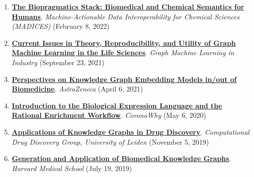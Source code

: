 \documentclass[10pt,a4paper,sans]{moderncv} %
\begin{document}
\begin{enumerate}
    \item \textbf{\href{https://docs.google.com/presentation/d/1D0HIX41IgVdTQYKlakWcvlZvOktX23EqbLcs3LmI7mg/edit?usp=sharing}{The Biopragmatics Stack: Biomedical and Chemical Semantics for Humans}}. \textit{Machine-Actionable Data Interoperability for Chemical Sciences (MADICES)} (February 8, 2022)

    \item \textbf{\href{https://www.youtube.com/watch?v=bLN1V5fZD2g&t=3665s}{Current Issues in Theory, Reproducibility, and Utility of Graph Machine Learning in the Life Sciences}}. \textit{Graph Machine Learning in Industry} (September 23, 2021)

    \item \textbf{\href{https://bit.ly/3wvP8yq}{Perspectives on Knowledge Graph Embedding Models in/out of Biomedicine}}. \textit{AstraZeneca} (April 6, 2021)

    \item \textbf{\href{https://youtu.be/rHhuVBpoKdI}{Introduction to the Biological Expression Language and the Rational Enrichment Workflow}}. \textit{CoronaWhy} (May 6, 2020)

    \item \textbf{\href{https://docs.google.com/presentation/d/1NQHQSD2EjOh-9XD6ffr2rDqs8AwOQ3wSBoie-e7-OXU/edit?usp=sharing}{Applications of Knowledge Graphs in Drug Discovery}}. \textit{Computational Drug Discovery Group, University of Leiden} (November 5, 2019)

    \item \textbf{\href{https://docs.google.com/presentation/d/11CG_Q3JrsqqKsDhl8uXP_TZzcyALhcVLvoP_pDmQ5JA/edit?usp=sharing}{Generation and Application of Biomedical Knowledge Graphs}}. \textit{Harvard Medical School} (July 19, 2019)

\end{enumerate}
\end{document}
